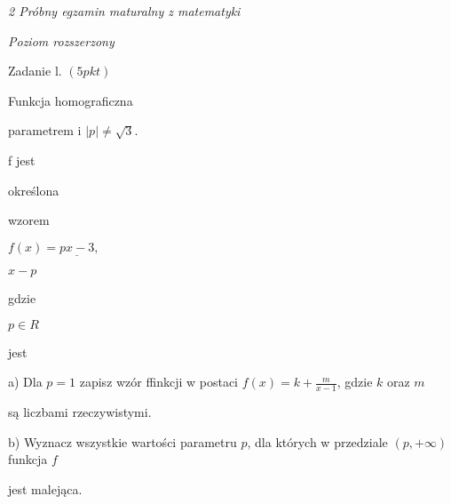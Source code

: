 \documentclass[a4paper,12pt]{article}
\begin{document}
{\it 2 Próbny egzamin maturalny z matematyki}

{\it Poziom rozszerzony}

Zadanie l. $(5pkt)$

Funkcja homograficzna

parametrem i $|p|\neq\sqrt{3}.$

f jest

określona

wzorem

$f(x)=\underline{px-3},$

$x-p$

gdzie

$p\in R$

jest

a) Dla $p=1$ zapisz wzór ffinkcji w postaci $f(x)=k+\displaystyle \frac{m}{x-1}$, gdzie $k$ oraz $m$

są liczbami rzeczywistymi.

b) Wyznacz wszystkie wartości parametru $p$, dla których w przedziale $(p,+\infty)$ funkcja $f$

jest malejąca.
\end{document}
